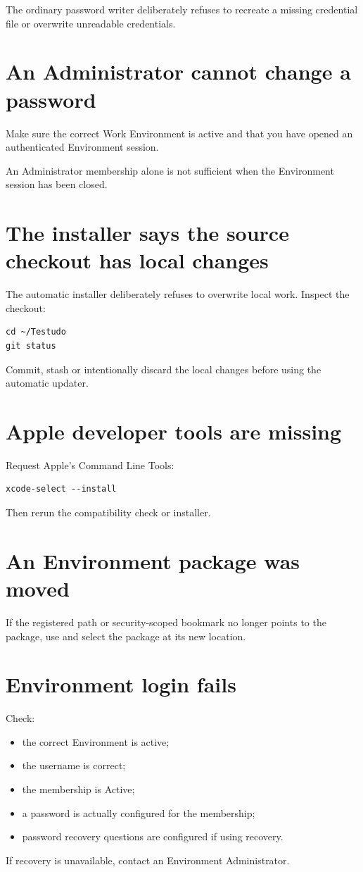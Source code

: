 \documentclass{testudomanual}
\begin{document}
The ordinary password writer deliberately refuses to recreate a missing credential file or overwrite unreadable credentials.

\section{An Administrator cannot change a password}

Make sure the correct Work Environment is active and that you have opened an authenticated Environment session.

An Administrator membership alone is not sufficient when the Environment session has been closed.


\section{The installer says the source checkout has local changes}

The automatic installer deliberately refuses to overwrite local work. Inspect the checkout:
\begin{lstlisting}
cd ~/Testudo
git status
\end{lstlisting}
Commit, stash or intentionally discard the local changes before using the automatic updater.

\section{Apple developer tools are missing}

Request Apple's Command Line Tools:
\begin{lstlisting}
xcode-select --install
\end{lstlisting}
Then rerun the compatibility check or installer.

\section{An Environment package was moved}

If the registered path or security-scoped bookmark no longer points to the package, use  and select the package at its new location.

\section{Environment login fails}

Check:
\begin{itemize}
    \item the correct Environment is active;
    \item the username is correct;
    \item the membership is Active;
    \item a password is actually configured for the membership;
    \item password recovery questions are configured if using recovery.
\end{itemize}
If recovery is unavailable, contact an Environment Administrator.
\end{document}
